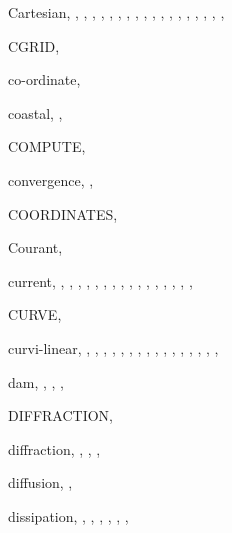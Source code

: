 \documentclass[12pt]{book}
\begin{document}
\begin{theindex}
  \item Cartesian, , , ,
		, , ,
		, , ,
		, , ,
		, , ,
		, , ,
  \item CGRID, 
  \item co-ordinate, 
  \item coastal, , 
  \item COMPUTE, 
  \item convergence, , 
  \item COORDINATES, 
  \item Courant, 
  \item current, , , ,
		, , ,
		, , ,
		, , ,
		, , ,
		, 
  \item CURVE, 
  \item curvi-linear, , , ,
		, , ,
		, , ,
		, , ,
		, , ,
		, 

  \indexspace

  \item dam, , , ,
  \item DIFFRACTION, 
  \item diffraction, , , ,
  \item diffusion, , 
  \item dissipation, , ,
		, , ,
		, 

  \indexspace


\end{theindex}
\end{document}
